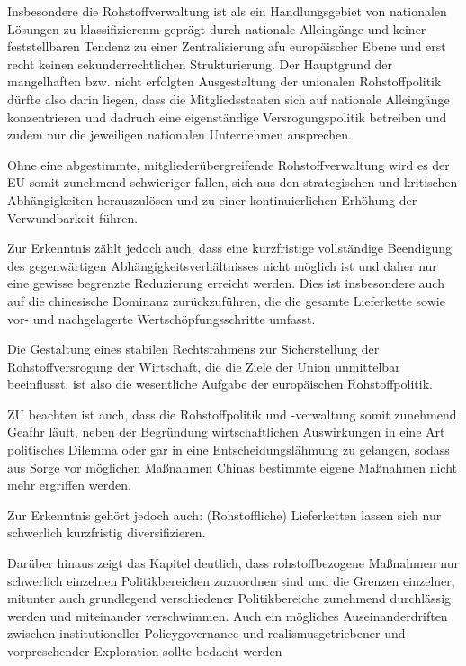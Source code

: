 \documentclass[12pt,a4paper,oneside]{book} %
\begin{document}
{Insbesondere die Rohstoffverwaltung ist als ein Handlungsgebiet von nationalen Lösungen zu klassifizierenm geprägt durch nationale Alleingänge und keiner feststellbaren Tendenz zu einer Zentralisierung afu europäischer Ebene und erst recht keinen sekunderrechtlichen Strukturierung. Der Hauptgrund der mangelhaften bzw. nicht erfolgten Ausgestaltung der unionalen Rohstoffpolitik dürfte also darin liegen, dass die Mitgliedsstaaten sich auf nationale Alleingänge konzentrieren und dadruch eine eigenständige Versrogungspolitik betreiben und zudem nur die jeweiligen nationalen Unternehmen ansprechen.

Ohne eine abgestimmte, mitgliederübergreifende Rohstoffverwaltung wird es der EU somit zunehmend schwieriger fallen, sich aus den strategischen und kritischen Abhängigkeiten herauszulösen und zu einer kontinuierlichen Erhöhung der Verwundbarkeit führen.

Zur Erkenntnis zählt jedoch auch, dass eine kurzfristige vollständige Beendigung des gegenwärtigen Abhängigkeitsverhältnisses nicht möglich ist und daher nur eine gewisse begrenzte Reduzierung erreicht werden. Dies ist insbesondere auch auf die chinesische Dominanz zurückzuführen, die die gesamte Lieferkette sowie vor- und nachgelagerte Wertschöpfungsschritte umfasst.

Die Gestaltung eines stabilen Rechtsrahmens zur Sicherstellung der Rohstoffversrogung der Wirtschaft, die die Ziele der Union unmittelbar beeinflusst, ist also die wesentliche Aufgabe der europäischen Rohstoffpolitik.

ZU beachten ist auch, dass die Rohstoffpolitik und -verwaltung somit zunehmend Geafhr läuft, neben der Begründung wirtschaftlichen Auswirkungen in eine Art politisches Dilemma oder gar in eine Entscheidungslähmung zu gelangen, sodass aus Sorge vor möglichen Maßnahmen Chinas bestimmte eigene Maßnahmen nicht mehr ergriffen werden.

Zur Erkenntnis gehört jedoch auch: (Rohstoffliche) Lieferketten lassen sich nur schwerlich kurzfristig diversifizieren.

Darüber hinaus zeigt das Kapitel deutlich, dass rohstoffbezogene Maßnahmen nur schwerlich einzelnen Politikbereichen zuzuordnen sind und die Grenzen einzelner, mitunter auch grundlegend verschiedener Politikbereiche zunehmend durchlässig werden und miteinander verschwimmen. Auch ein mögliches Auseinanderdriften zwischen institutioneller Policygovernance und realismusgetriebener und vorpreschender Exploration sollte bedacht werden

}
\end{document}
